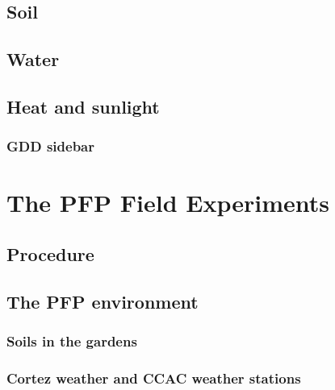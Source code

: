 \documentclass[12pt,]{krantz}
\theoremstyle{definition}
\theoremstyle{definition}
\theoremstyle{definition}
\theoremstyle{remark}
\begin{document}
\hypertarget{soil}{%
\section{Soil}\label{soil}}

\hypertarget{water}{%
\section{Water}\label{water}}

\hypertarget{heat-and-sunlight}{%
\section{Heat and sunlight}\label{heat-and-sunlight}}

\hypertarget{gdd-sidebar}{%
\subsection*{GDD sidebar}\label{gdd-sidebar}}


\hypertarget{the-pfp-field-experiments}{%
\chapter{The PFP Field Experiments}\label{the-pfp-field-experiments}}

\hypertarget{procedure}{%
\section{Procedure}\label{procedure}}

\hypertarget{the-pfp-environment}{%
\section{The PFP environment}\label{the-pfp-environment}}

\hypertarget{soils-in-the-gardens}{%
\subsection*{Soils in the gardens}\label{soils-in-the-gardens}}


\hypertarget{cortez-weather-and-ccac-weather-stations}{%
\subsection{Cortez weather and CCAC weather
stations}\label{cortez-weather-and-ccac-weather-stations}}
\end{document}
